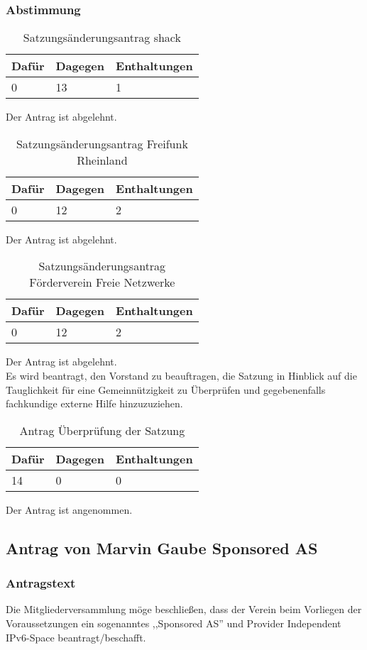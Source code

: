 \documentclass[a4paper]{scrartcl}
\begin{document}
\subsubsection{Abstimmung}
\begin{table}[H]
	\begin{tabularx}{\textwidth}{XXX}
		Dafür & Dagegen & Enthaltungen\\
		\toprule
		0 & 13 & 1\\
	\end{tabularx}
	\caption{Satzungsänderungsantrag shack}
\end{table}
Der Antrag ist abgelehnt.
\\
\begin{table}[H]
	\begin{tabularx}{\textwidth}{XXX}
		Dafür & Dagegen & Enthaltungen\\
		\toprule
		0 & 12 & 2\\
	\end{tabularx}
	\caption{Satzungsänderungsantrag Freifunk Rheinland}
\end{table}
Der Antrag ist abgelehnt.
\\
\begin{table}[H]
	\begin{tabularx}{\textwidth}{XXX}
		Dafür & Dagegen & Enthaltungen\\
		\toprule
		0 & 12 & 2\\
	\end{tabularx}
	\caption{Satzungsänderungsantrag Förderverein Freie Netzwerke}
\end{table}
Der Antrag ist abgelehnt.
\\
Es wird beantragt, den Vorstand zu beauftragen, die Satzung in Hinblick auf die Tauglichkeit für eine Gemeinnützigkeit zu Überprüfen und gegebenenfalls fachkundige externe Hilfe hinzuzuziehen.
\begin{table}[H]
	\begin{tabularx}{\textwidth}{XXX}
		Dafür & Dagegen & Enthaltungen\\
		\toprule
		14 & 0 & 0\\
	\end{tabularx}
	\caption{Antrag Überprüfung der Satzung}
\end{table}
Der Antrag ist angenommen.

\subsection{Antrag von Marvin Gaube Sponsored AS}
\subsubsection{Antragstext}
Die Mitgliederversammlung möge beschließen, dass der Verein beim Vorliegen der Voraussetzungen ein sogenanntes ,,Sponsored AS'' und Provider Independent IPv6-Space beantragt/beschafft.
\end{document}
